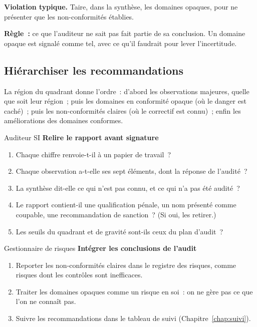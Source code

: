 \begin{boxalert}
\textbf{Violation typique.} Taire, dans la synthèse, les domaines opaques,
pour ne présenter que les non-conformités établies.

\smallskip
\textbf{Règle~:} ce que l'auditeur ne sait pas fait partie de sa conclusion.
Un domaine opaque est signalé comme tel, avec ce qu'il faudrait pour lever
l'incertitude.
\end{boxalert}

\subsection{Hiérarchiser les recommandations}

La région du quadrant donne l'ordre~: d'abord les observations majeures,
quelle que soit leur région~; puis les domaines en conformité opaque (où le
danger est caché)~; puis les non-conformités claires (où le correctif est
connu)~; enfin les améliorations des domaines conformes.

\begin{boxmetier}{Auditeur SI}
\textbf{Relire le rapport avant signature}
\begin{enumerate}
    \item Chaque chiffre renvoie-t-il à un papier de travail~?
    \item Chaque observation a-t-elle ses sept éléments, dont la réponse de
          l'audité~?
    \item La synthèse dit-elle ce qui n'est pas connu, et ce qui n'a pas été
          audité~?
    \item Le rapport contient-il une qualification pénale, un nom présenté
          comme coupable, une recommandation de sanction~? (Si oui, les
          retirer.)
    \item Les seuils du quadrant et de gravité sont-ils ceux du plan
          d'audit~?
\end{enumerate}
\end{boxmetier}

\begin{boxmetier}{Gestionnaire de risques}
\textbf{Intégrer les conclusions de l'audit}
\begin{enumerate}
    \item Reporter les non-conformités claires dans le registre des risques,
          comme risques dont les contrôles sont inefficaces.
    \item Traiter les domaines opaques comme un risque en soi~: on ne gère
          pas ce que l'on ne connaît pas.
    \item Suivre les recommandations dans le tableau de suivi
          (Chapitre~\ref{chap:suivi}).
\end{enumerate}
\end{boxmetier}

